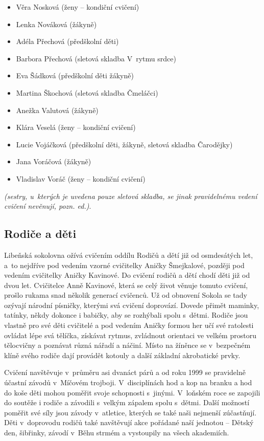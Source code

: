 \documentclass[a5paper, 11pt, twoside]{article}
\newcommand{\pozned}[1]{%
\textit{#1}}
\begin{document}
\begin{itemize}[label={},itemindent=-2em,leftmargin=2em,nosep]
  \item Věra Nosková (ženy -- kondiční cvičení)
  \item Lenka Nováková (žákyně)
  \item Adéla Přechová (předškolní děti)
  \item Barbora Přechová (sletová skladba V~rytmu srdce)
  \item Eva Šádková (předškolní děti žákyně)
  \item Martina Škochová (sletová skladba Čmeláčci)
  \item Anežka Valutová (žákyně)
  \item Klára Veselá (ženy -- kondiční cvičení)
  \item Lucie Vojáčková (předškolní děti, žákyně, sletová skladba Čarodějky)
  \item Jana Voráčová (žákyně)
  \item Vladislav Voráč (ženy -- kondiční cvičení)
  \end{itemize}
\smallskip
\noindent
\pozned{(sestry, u~kterých je uvedena
pouze sletová skladba, se jinak pravidelnému vedení cvičení nevěnují,
pozn. ed.)}.

\subsection{Rodiče a děti}

Libeňská sokolovna ožívá cvičením oddílu Rodičů a dětí již od
osmdesátých let, a~to nejdříve pod vedením vzorné cvičitelky Aničky
Šmejkalové, později pod vedením cvičitelky Aničky Kavinové. Do cvičení
rodičů a dětí chodí děti již od dvou let. Cvičitelce Anně Kavinové,
která se celý život věnuje tomuto cvičení, prošlo rukama snad několik
generací cvičenců. Už od obnovení Sokola se tady ozývají národní
písničky, kterými svá cvičení doprovází. Dovede přimět maminky, tatínky,
někdy dokonce i babičky, aby se rozhýbali spolu s~dětmi. Rodiče jsou
vlastně pro své děti cvičitelé a pod vedením Aničky formou her učí své
ratolesti ovládat lépe svá tělíčka, získávat rytmus, zvládnout orientaci
ve velkém prostoru tělocvičny a poznávat různá nářadí a náčiní. Místo na
žíněnce se v~bezpečném klíně svého rodiče dají provádět kotouly a další
základní akrobatické prvky.

Cvičení navštěvuje v~průměru asi dvanáct párů a od roku 1999 se
pravidelně účastní závodů v~Míčovém trojboji. V~disciplínách hod a kop
na branku a hod do koše děti mohou poměřit svoje schopnosti s~jinými.
V~loňském roce se zapojili do soutěže i rodiče a závodili s~velkým zápalem
spolu s~dětmi. Další možností poměřit své síly jsou závody v~atletice,
kterých se také naši nejmenší zúčastňují. Děti v~doprovodu rodičů také
navštěvují akce pořádané naší jednotou -- Dětský den, šibřinky, závodí
v~Běhu strmém a vystoupily na všech akademiích.
\end{document}
